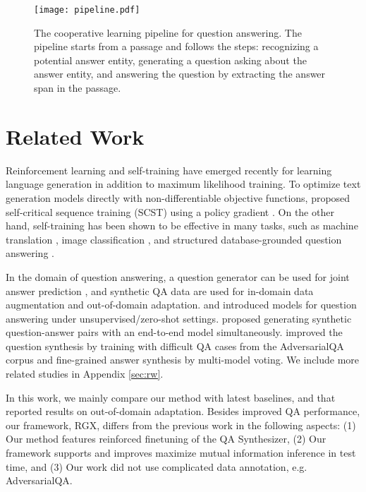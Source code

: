 \documentclass[11pt,a4paper]{article}
\begin{document}
\begin{figure*}[h]
\centering
\texttt{[image: pipeline.pdf]}
\caption{The cooperative learning pipeline for question answering. The pipeline starts from a passage and follows the steps:  recognizing a potential answer entity,  generating a question asking about the answer entity, and  answering the question by extracting the answer span in the passage.}
\label{fig:pipeline}
\end{figure*}
\section{Related Work}








Reinforcement learning and self-training have emerged recently for learning language generation in addition to maximum likelihood training. To optimize text generation models directly with non-differentiable objective functions, \citet{rennie2017self} proposed self-critical sequence training (SCST) using a policy gradient \cite{kakade2001natural,silver2014deterministic}. On the other hand, self-training has been shown to be effective in many tasks, such as machine translation \cite{he2019revisiting}, image classification \cite{xie2020self}, and structured database-grounded question answering \cite{xu2020autoqa}.

In the domain of question answering, a question generator can be used for joint answer prediction \cite{tang2017question,duan2017question}, and synthetic QA data are used for in-domain data augmentation \cite{sachan2018self,puri2020training,liu2020tell,klein2019learning} and out-of-domain adaptation. \citet{lewis2019unsupervised} and \citet{lee2020generating} introduced models for question answering under unsupervised/zero-shot settings. \citet{shakeri2020end} proposed generating synthetic question-answer pairs with an end-to-end model simultaneously. \citet{bartolo2021improving} improved the question synthesis by training with difficult QA cases from the AdversarialQA corpus \cite{bartolo2020beat} and fine-grained answer synthesis by multi-model voting. We include more related studies in Appendix \ref{sec:rw}.

In this work, we mainly compare our method with latest baselines, \citet{shakeri2020end} and \citet{bartolo2021improving} that reported results on out-of-domain adaptation. Besides improved QA performance, our framework, RGX, differs from the previous work in the following aspects: (1) Our method features reinforced finetuning of the QA Synthesizer, (2) Our framework supports and improves maximize mutual information inference in test time, and (3) Our work did not use complicated data annotation, e.g. AdversarialQA.
\end{document}
